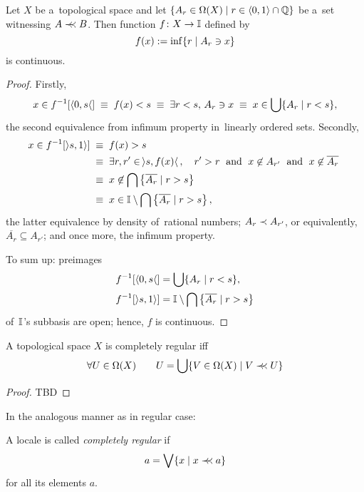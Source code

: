 \begin{lem} \label{cb->continuous}
  Let $X$ be a~topological space and let $\{A_r\in \Omega(X) \mid r\in \langle
  0, 1 \rangle \cap \mathbb{Q}\}$ be a~set witnessing $A \prec\mkern-7mu\prec B$.
  Then function $f\colon X \to \mathbb{I}$ defined by
  \[
    f(x) := \inf \{r \mid A_r \owns x\}
  \]
  is continuous.
\end{lem}
\begin{proof}
  Firstly,
  \[
    x\in f^{-1}[\langle 0, s \langle] \; \equiv \;
    f(x) < s \; \equiv \;
    \exists r < s, \, A_r \owns x \; \equiv \;
    x\in \bigcup \{ A_r \mid r < s \},
  \]
  the second equivalence from infimum property in~linearly ordered sets.
  Secondly,
  \begin{align*}
    x\in f^{-1}[\rangle s, 1 \rangle] \; &\equiv \;
    f(x) > s \\
    &\equiv \; \exists r, r' \in \,\rangle s, f(x) \langle\,, \quad  r' > r
    \;\text{ and }\; x\not\in A_{r'} \;\text{ and }\; x\not\in \overline{A_r}
    \; \\
    &\equiv \; x\not\in \bigcap \left\{ \overline{A_r} \mid r > s \right\} \\
    &\equiv \; x\in \mathbb{I}\setminus \bigcap \left\{ \overline{A_r} \mid r > s
    \right\},
  \end{align*}
  the latter equivalence by density of~rational numbers;
  $A_r \prec A_{r'}$, or equivalently, $\overline{A_r}\subseteq A_{r'}$;
  and once more, the infimum property.

  To sum up: preimages
  \begin{align*}
    f^{-1}[\langle 0, s \langle] &= \bigcup \{ A_r \mid r < s \}, \\
    f^{-1}[\rangle s, 1 \rangle] &= \mathbb{I}\setminus \bigcap \left\{ \overline{A_r} \mid r > s \right\}
  \end{align*}
  of~$\mathbb{I}$'s subbasis are open;
  hence, $f$ is continuous.
\end{proof}

\begin{prop} \label{T3,5-char}
  A topological space $X$ is completely regular iff
  \[
    \forall U\in \Omega(X) \qquad U = \bigcup\{V\in \Omega(X) \mid V \prec\mkern-7mu\prec U\}
  \]
\end{prop}
\begin{proof}
  TBD
\end{proof}

In the analogous manner as in regular case:

\begin{framed}
  \begin{df}[CReg]
    A locale is called \emph{completely regular\/} if
    \[
      a = \bigvee \{x \mid x \prec\mkern-7mu\prec a\}
    \]
    for all its elements $a$.
  \end{df}
\end{framed}
